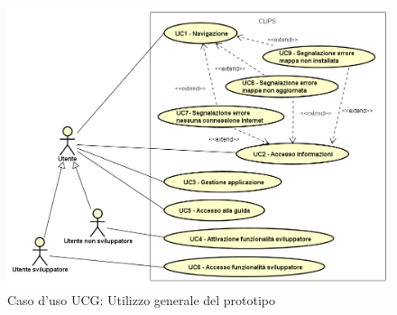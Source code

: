 \documentclass[../AnalisiDeiRequisiti.tex]{subfiles}
\begin{document}
\begin{figure}[H]
	\centering
	\includegraphics[scale=0.95, width=\textwidth]{img/UCG.png}
	\caption{Caso d'uso UCG: Utilizzo generale del prototipo}\label{fig:UCG} 
\end{figure}
\end{document}
